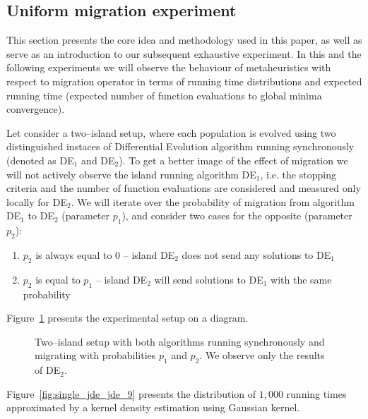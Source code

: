 \documentclass{sig-alternate}
\begin{document}
\subsection{Uniform migration experiment}
This section presents the core idea and methodology used in this paper, as well as serve as an introduction to our subsequent exhaustive experiment.
In this and the following experiments we will observe the behaviour of metaheuristics with respect to migration operator in terms of running time distributions and expected running time (expected number of function evaluations to global minima convergence).

Let consider a two--island setup, where each population is evolved using two distinguished instaces of Differential Evolution algorithm running synchronously (denoted as DE$_1$ and DE$_2$).
To get a better image of the effect of migration we will not actively observe the island running algorithm DE$_1$, i.e. the stopping criteria and the number of function evaluations are considered and measured only locally for DE$_2$.
We will iterate over the probability of migration from algorithm DE$_1$ to DE$_2$ (parameter $p_1$), and consider two cases for the opposite (parameter $p_2$): 
\begin{enumerate}
    \item $p_2$ is always equal to 0 -- island DE$_2$ does not send any solutions to DE$_1$
    \item $p_2$ is equal to $p_1$ -- island DE$_2$ will send solutions to DE$_1$ with the same probability
\end{enumerate}
Figure~\ref{graph:twoisl} presents the experimental setup on a diagram.
\begin{figure}[ht!]
    \label{graph:twoisl}
    \caption{Two--island setup with both algorithms running synchronously and migrating with probabilities $p_1$ and $p_2$. We observe only the results of DE$_2$.}

\end{figure}
Figure~\ref{fig:single_jde_jde_9} presents the distribution of $1,000$ running times approximated by a kernel density estimation using Gaussian kernel.
\end{document}
